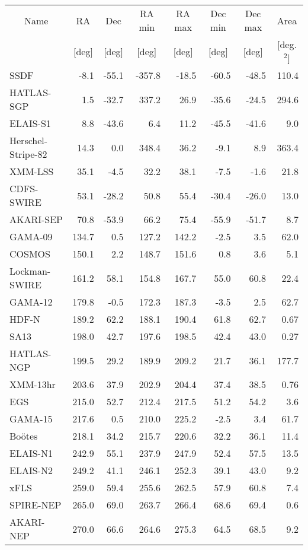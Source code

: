 \begin{tabular}{|l|r|r|r|r|r|r|r|}
\hline
  \multicolumn{1}{|c|}{Name} &
  \multicolumn{1}{c|}{RA} &
  \multicolumn{1}{c|}{Dec} &
  \multicolumn{1}{c|}{RA min} &
  \multicolumn{1}{c|}{RA max} &
  \multicolumn{1}{c|}{Dec min} &
  \multicolumn{1}{c|}{Dec max} &
  \multicolumn{1}{c|}{Area} \\
  \multicolumn{1}{|c|}{} &
  \multicolumn{1}{c|}{[deg]} &
  \multicolumn{1}{c|}{[deg]} &
  \multicolumn{1}{c|}{[deg]} &
  \multicolumn{1}{c|}{[deg]} &
  \multicolumn{1}{c|}{[deg]} &
  \multicolumn{1}{c|}{[deg]} &
  \multicolumn{1}{c|}{[deg.$^2$]} \\
\hline
  SSDF & -8.1 & -55.1 & -357.8 & -18.5 & -60.5 & -48.5 & 110.4\\
  HATLAS-SGP & 1.5 & -32.7 & 337.2 & 26.9 & -35.6 & -24.5 & 294.6\\
  ELAIS-S1 & 8.8 & -43.6 & 6.4 & 11.2 & -45.5 & -41.6 & 9.0\\
  Herschel-Stripe-82 & 14.3 & 0.0 & 348.4 & 36.2 & -9.1 & 8.9 & 363.4\\
  XMM-LSS & 35.1 & -4.5 & 32.2 & 38.1 & -7.5 & -1.6 & 21.8\\
  CDFS-SWIRE & 53.1 & -28.2 & 50.8 & 55.4 & -30.4 & -26.0 & 13.0\\
  AKARI-SEP & 70.8 & -53.9 & 66.2 & 75.4 & -55.9 & -51.7 & 8.7\\
  GAMA-09 & 134.7 & 0.5 & 127.2 & 142.2 & -2.5 & 3.5 & 62.0\\
  COSMOS & 150.1 & 2.2 & 148.7 & 151.6 & 0.8 & 3.6 & 5.1\\
  Lockman-SWIRE & 161.2 & 58.1 & 154.8 & 167.7 & 55.0 & 60.8 & 22.4\\
  GAMA-12 & 179.8 & -0.5 & 172.3 & 187.3 & -3.5 & 2.5 & 62.7\\
  HDF-N & 189.2 & 62.2 & 188.1 & 190.4 & 61.8 & 62.7 & 0.67\\
  SA13 & 198.0 & 42.7 & 197.6 & 198.5 & 42.4 & 43.0 & 0.27\\
  HATLAS-NGP & 199.5 & 29.2 & 189.9 & 209.2 & 21.7 & 36.1 & 177.7\\
  XMM-13hr & 203.6 & 37.9 & 202.9 & 204.4 & 37.4 & 38.5 & 0.76\\
  EGS & 215.0 & 52.7 & 212.4 & 217.5 & 51.2 & 54.2 & 3.6\\
  GAMA-15 & 217.6 & 0.5 & 210.0 & 225.2 & -2.5 & 3.4 & 61.7\\
  Bo\"otes & 218.1 & 34.2 & 215.7 & 220.6 & 32.2 & 36.1 & 11.4\\
  ELAIS-N1 & 242.9 & 55.1 & 237.9 & 247.9 & 52.4 & 57.5 & 13.5\\
  ELAIS-N2 & 249.2 & 41.1 & 246.1 & 252.3 & 39.1 & 43.0 & 9.2\\
  xFLS & 259.0 & 59.4 & 255.6 & 262.5 & 57.9 & 60.8 & 7.4\\
  SPIRE-NEP & 265.0 & 69.0 & 263.7 & 266.4 & 68.6 & 69.4 & 0.6\\
  AKARI-NEP & 270.0 & 66.6 & 264.6 & 275.3 & 64.5 & 68.5 & 9.2\\
\hline\end{tabular}
